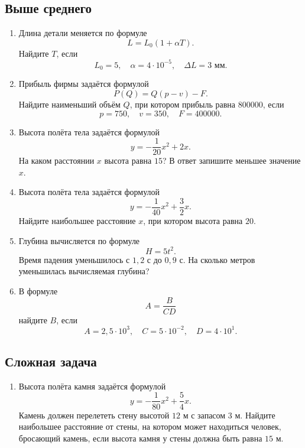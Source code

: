 \documentclass[a4paper,12pt]{article}
\begin{document}
\subsection*{Выше среднего}

\begin{enumerate}[resume]
  \item Длина детали меняется по формуле
  \[
  L=L_0(1+\alpha T).
  \]
  Найдите \(T\), если
  \[
  L_0=5,\quad \alpha=4\cdot10^{-5},\quad \Delta L=3\text{ мм}.
  \]

  \item Прибыль фирмы задаётся формулой
  \[
  P(Q)=Q(p-v)-F.
  \]
  Найдите наименьший объём \(Q\), при котором прибыль равна \(800000\), если
  \[
  p=750,\quad v=350,\quad F=400000.
  \]

  \item Высота полёта тела задаётся формулой
  \[
  y=-\frac{1}{20}x^2+2x.
  \]
  На каком расстоянии \(x\) высота равна \(15\)? В ответ запишите меньшее значение \(x\).

  \item Высота полёта тела задаётся формулой
  \[
  y=-\frac{1}{40}x^2+\frac32x.
  \]
  Найдите наибольшее расстояние \(x\), при котором высота равна \(20\).

  \item Глубина вычисляется по формуле
  \[
  H=5t^2.
  \]
  Время падения уменьшилось с \(1{,}2\) с до \(0{,}9\) с. На сколько метров уменьшилась вычисляемая глубина?

  \item В формуле
  \[
  A=\frac{B}{CD}
  \]
  найдите \(B\), если
  \[
  A=2{,}5\cdot10^3,\quad C=5\cdot10^{-2},\quad D=4\cdot10^1.
  \]
\end{enumerate}

\subsection*{Сложная задача}

\begin{enumerate}[resume]
  \item Высота полёта камня задаётся формулой
  \[
  y=-\frac{1}{80}x^2+\frac54x.
  \]
  Камень должен перелететь стену высотой \(12\) м с запасом \(3\) м. Найдите наибольшее расстояние от стены, на котором может находиться человек, бросающий камень, если высота камня у стены должна быть равна \(15\) м.
\end{enumerate}

\newpage
\end{document}
